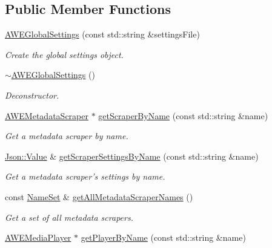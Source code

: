 \subsection*{Public Member Functions}
\begin{DoxyCompactItemize}
\item 
\hyperlink{class_a_w_e_global_settings_a8467ff819ebcdc6a996e7b5f48d78cbf}{A\-W\-E\-Global\-Settings} (const std\-::string \&settings\-File)
\begin{DoxyCompactList}\small\item\em Create the global settings object. \end{DoxyCompactList}\item 
\hyperlink{class_a_w_e_global_settings_ab5b1fec22a436ffb049af768fe0da8fb}{$\sim$\-A\-W\-E\-Global\-Settings} ()
\begin{DoxyCompactList}\small\item\em Deconstructor. \end{DoxyCompactList}\item 
\hyperlink{class_a_w_e_metadata_scraper}{A\-W\-E\-Metadata\-Scraper} $\ast$ \hyperlink{class_a_w_e_global_settings_aac36c42767b332c9da7b015c591dcafc}{get\-Scraper\-By\-Name} (const std\-::string \&name)
\begin{DoxyCompactList}\small\item\em Get a metadata scraper by name. \end{DoxyCompactList}\item 
\hyperlink{class_json_1_1_value}{Json\-::\-Value} \& \hyperlink{class_a_w_e_global_settings_a3309ca85ae10b1805da02522ed0d182f}{get\-Scraper\-Settings\-By\-Name} (const std\-::string \&name)
\begin{DoxyCompactList}\small\item\em Get a metadata scraper's settings by name. \end{DoxyCompactList}\item 
const \hyperlink{class_a_w_e_global_settings_a62d5ef5b82be32d6f025abe839436aba}{Name\-Set} \& \hyperlink{class_a_w_e_global_settings_a4aa288c1b61a457988b418dabbc03f00}{get\-All\-Metadata\-Scraper\-Names} ()
\begin{DoxyCompactList}\small\item\em Get a set of all metadata scrapers. \end{DoxyCompactList}\item 
\hyperlink{class_a_w_e_media_player}{A\-W\-E\-Media\-Player} $\ast$ \hyperlink{class_a_w_e_global_settings_a974f4f6b700e4eb221c7e5b6a6d6b0a4}{get\-Player\-By\-Name} (const std\-::string \&name)

\end{DoxyCompactItemize}
